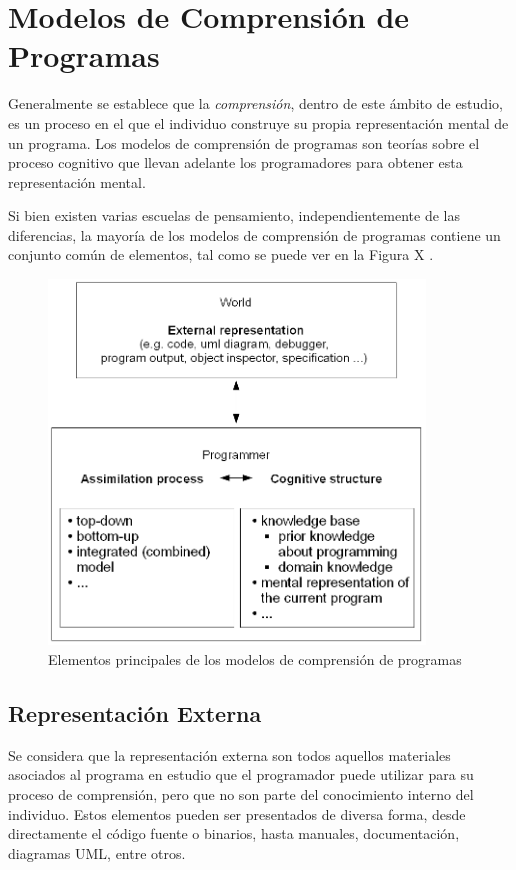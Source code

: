 \section{Modelos de Comprensión de Programas}

Generalmente se establece que la \textit{comprensión}, dentro de este ámbito de estudio, es un
proceso en el que el individuo construye su propia representación mental de un programa.
Los modelos de comprensión de programas son teorías sobre el proceso cognitivo que llevan
adelante los programadores para obtener esta representación mental.

Si bien existen varias escuelas de pensamiento, independientemente de las diferencias, la
mayoría de los modelos de comprensión de programas contiene un conjunto común de elementos,
tal como se puede ver en la Figura X \cite{SchulteClear10}.

\begin{figure}[H]
    \includegraphics[width=10cm]{program_comprehension/elements.png}
    \centering
    \caption{Elementos principales de los modelos de comprensión de programas}
\end{figure}

\subsection{Representación Externa}
Se considera que la representación externa son todos aquellos materiales asociados al programa
en estudio que el programador puede utilizar para su proceso de comprensión, pero que no son 
parte del conocimiento interno del individuo.
Estos elementos pueden ser presentados de diversa forma, desde directamente el código fuente
o binarios, hasta manuales, documentación, diagramas UML, entre otros.

